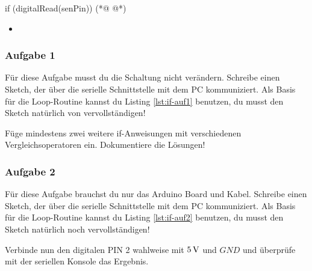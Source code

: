 \begin{multicols}{2}
\null\vfill 
\begin{arduinoCode}{}{}
  
if (digitalRead(senPin)) 
        (*@  @*)


\end{arduinoCode}

\vfill\null 
\columnbreak

\null\vfill
\begin{itemize}
  \itemsep15pt
  \item[] 
  \end{itemize}
\vfill \null

\end{multicols}



\subsubsection{Aufgabe 1}
Für diese Aufgabe musst du die Schaltung nicht verändern. Schreibe einen Sketch, der über die serielle Schnittstelle mit dem PC kommuniziert. Als Basis für die Loop-Routine kannst du Listing \ref{lst:if-auf1} benutzen, du musst den Sketch natürlich von vervollständigen! 

Füge mindestens zwei weitere if-Anweisungen mit verschiedenen Vergleichsoperatoren ein. Dokumentiere die Lösungen! 

\subsubsection{Aufgabe 2}
Für diese Aufgabe brauchst du nur das Arduino Board und Kabel. Schreibe einen Sketch, der über die serielle Schnittstelle mit dem PC kommuniziert. Als Basis für die Loop-Routine kannst du Listing \ref{lst:if-auf2} benutzen, du musst den Sketch natürlich noch vervollständigen! 

Verbinde nun den digitalen PIN 2 wahlweise mit $5\operatorname{V}$ und $GND$ und überprüfe mit der seriellen Konsole das Ergebnis.

